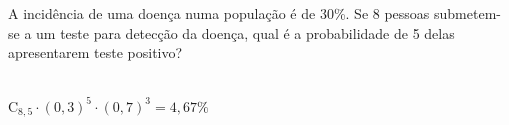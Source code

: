 \begin{ex}
A incidência de uma doença numa população é de 30\%. Se 8 pessoas submetem-se a um teste para  detecção da doença, qual é a probabilidade de 5 delas apresentarem teste positivo?
 \begin{sol}
   \phantom{A}\\
   $\mathrm{C}_{8,5}\cdot(0,3)^5\cdot(0,7)^3=4,67\%$
 \end{sol}
\end{ex}